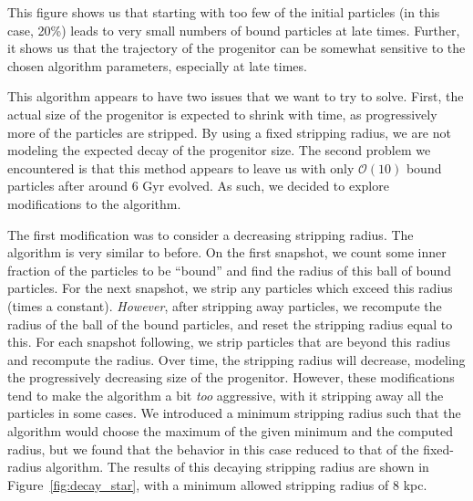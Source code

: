 This figure shows us that starting with too few of the initial particles (in
this case, 20\%) leads to very small numbers of bound particles at late times.
Further, it shows us that the trajectory of the progenitor can be somewhat
sensitive to the chosen algorithm parameters, especially at late times.

This algorithm appears to have two issues that we want to try to solve.
First, the actual size of the progenitor is expected to shrink with time, as
progressively more of the particles are stripped.  By using a fixed stripping
radius, we are not modeling the expected decay of the progenitor size.  The
second problem we encountered is that this method appears to leave us with
only $\mathcal{O}(10)$ bound particles after around 6 Gyr evolved.  As such,
we decided to explore modifications to the algorithm.

The first modification was to consider a decreasing stripping radius.  The
algorithm is very similar to before.  On the first snapshot, we count some
inner fraction of the particles to be ``bound'' and find the radius of this
ball of bound particles.  For the next snapshot, we strip any particles
which exceed this radius (times a constant).  \textit{However}, after
stripping away particles, we recompute the radius of the ball of the bound
particles, and reset the stripping radius equal to this. For each snapshot
following, we strip particles that are beyond this radius and recompute the
radius.  Over time, the stripping radius will decrease, modeling the
progressively decreasing size of the progenitor.  However, these modifications
tend to make the algorithm a bit \textit{too} aggressive, with it stripping
away all the particles in some cases.  We introduced a minimum stripping
radius such that the algorithm would choose the maximum of the given minimum and
the computed radius, but we found that the behavior in this case reduced to that
of the fixed-radius algorithm. The results of this decaying stripping radius are
shown in Figure~\ref{fig:decay_star}, with a minimum allowed stripping radius
of 8 kpc.

